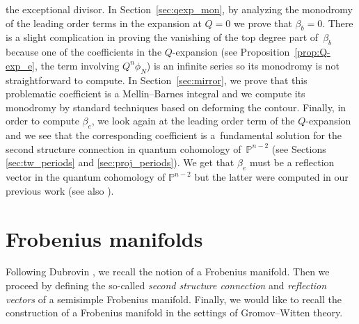 \documentclass[10pt,a4paper]{article}
\numberwithin{equation}{section}
\begin{document}
the exceptional divisor. In Section~\ref{sec:qexp_mon}, by analyzing
the monodromy of the leading order terms in the expansion at $Q=0$ we
prove that $\beta_b=0$. There is a slight complication in proving the
vanishing of the top degree part of~$\beta_b$ because one of the
coefficients in the $Q$-expansion (see Proposition~\ref{prop:Q-exp_e},
the term involving $Q^n\phi_N$) is an infinite series so its monodromy
is not straightforward to compute. In Section~\ref{sec:mirror}, we
prove that this problematic coefficient is a Mellin--Barnes integral
and we compute its monodromy by standard techniques based on deforming
the contour. Finally, in order to compute $\beta_e$, we look again at
the leading order term of the $Q$-expansion and we see that the
corresponding coefficient is a~fundamental solution for the second
structure connection in quantum cohomology of~$\mathbb{P}^{n-2}$ (see
Sections \ref{sec:tw_periods} and \ref{sec:proj_periods}). We get that
$\beta_e$ must be a reflection vector in the quantum cohomology of
$\mathbb{P}^{n-2}$ but the latter were computed in our previous work
\cite{Milanov:p2} (see also \cite{Iritani:gamma_structure}).




\section{Frobenius manifolds}\label{sec:frobenius_manifolds}





Following Dubrovin \cite{Du}, we recall the notion of a Frobenius
manifold. Then we proceed by defining the so-called {\em second
 structure connection} and {\em reflection vectors} of a semisimple
Frobenius manifold. Finally, we would like to recall the construction
of a Frobenius manifold in the settings of Gromov--Witten theory.
\end{document}
